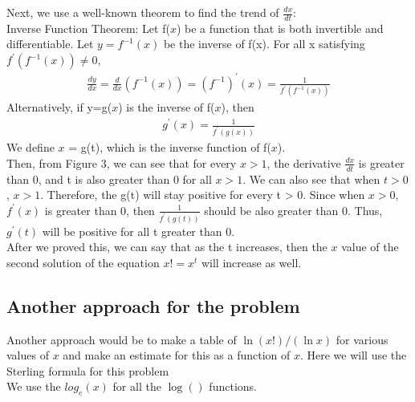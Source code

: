 \documentclass{article}
\begin{document}
        Next, we use a well-known theorem to find the trend of $\frac{dx}{dt}$:\\
        Inverse Function Theorem: Let f($x$) be a function that is both invertible and differentiable. Let  $y = f^{-1}(x)$ be the inverse of f(x). For all  x satisfying  $f^{'}(f^{-1}(x)) \neq 0$,
            \begin{align*}
                \frac{dy}{dx} = \frac{d}{dx} (f^{-1}(x)) = (f^{-1})^{'}(x) = \frac{1}{f^{'}(f^{-1}(x))}
            \end{align*}
        Alternatively, if  y=g($x$) is the inverse of  f($x$), then
            \begin{align*}
                g^{'}(x) = \frac{1}{f^{'}(g(x))}
            \end{align*}
        We define $x$ = g(t), which is the inverse function of f($x$).\\
        Then, from Figure 3, we can see that for every $x > 1$, the derivative $\frac{dx}{dt}$ is greater than 0, and t is also greater than 0 for all $x > 1$. We can also see that when $t > 0$, $x > 1$. Therefore, the g(t) will stay positive for every t > 0. Since when $x > 0$, $f^{'}(x)$ is greater than 0, then $\frac{1}{f^{'}(g(t))}$ should be also greater than 0. Thus, $g^{'}(t)$ will be positive for all t greater than 0. \\

        After we proved this, we can say that as the t increases, then the $x$ value of the second solution of the equation $x! = x ^ {t}$ will increase as well.

        \subsection{Another approach for the problem}
        Another approach would be to make a table of $\ln(x!)/(\ln x)$ for various values of $x$ and make an estimate for this as a function of $x$. Here we will use the Sterling formula for this problem\\
        We use the $log_e(x)$ for all the $\log()$ functions.\\
        
\end{document}
